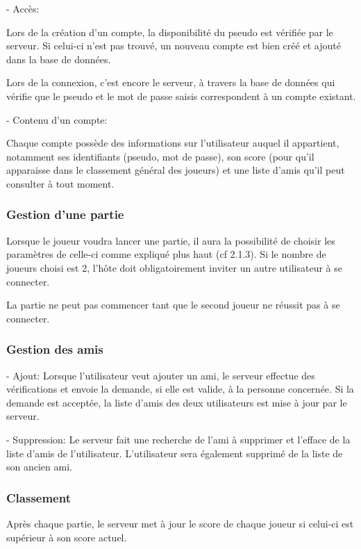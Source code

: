 \documentclass[a4paper,12pt]{article}
\begin{document}
- Accès:

Lors de la création d'un compte, la disponibilité du pseudo est vérifiée par le serveur. Si celui-ci n'est pas trouvé, un nouveau compte est bien créé et ajouté dans la base de données.

Lors de la connexion, c'est encore le serveur, à travers la base de données qui vérifie que le pseudo et le mot de passe saisis correspondent à un compte existant.

- Contenu d'un compte:

Chaque compte possède des informations sur l'utilisateur auquel il appartient, notamment ses identifiants (pseudo, mot de passe), son score (pour qu'il apparaisse dans le classement général des joueurs) et une liste d'amis qu'il peut consulter à tout moment.

\subsubsection{Gestion d'une partie}

Lorsque le joueur voudra lancer une partie,
il aura la possibilité de choisir les paramètres de celle-ci comme expliqué plus haut (cf 2.1.3). Si le nombre de joueurs choisi est 2, l'hôte doit obligatoirement inviter un autre utilisateur à se connecter.

La partie ne peut pas commencer tant que le second joueur ne réussit pas à se connecter.
\subsubsection{Gestion des amis}

- Ajout: Lorsque l'utilisateur veut ajouter un ami, le serveur effectue des vérifications et envoie la demande, si elle est valide, à la personne concernée. Si la demande est acceptée, la liste d'amis des deux utilisateurs est mise à jour par le serveur.

- Suppression: Le serveur fait une recherche de l'ami à supprimer et l'efface de la liste d'amis de l'utilisateur. L'utilisateur sera également supprimé de la liste de son ancien ami.


\subsubsection{Classement}

Après chaque partie, le serveur met à jour le score de chaque joueur si celui-ci est supérieur à son score actuel.
\end{document}
